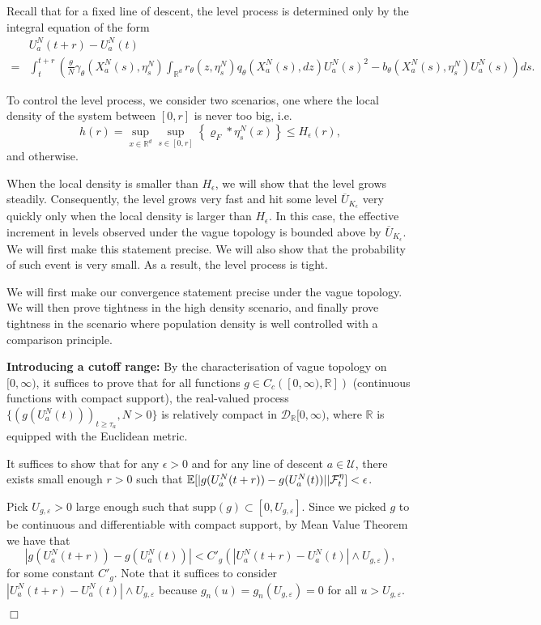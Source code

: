 \documentclass[12pt]{article}
\newenvironment {proof}{{\noindent\bf Proof }}{\hfill $\Box$ \medskip}
\newcommand{\IR}{\mathbb R}
\begin{document}
\begin{proof} Recall that for a fixed line of descent, the level process is determined only by the integral equation of the form 
\begin{align*}
&U^{N}_{a}(t+r)-U^{N}_{a}(t)\\
=&\int_{t}^{t+r}
\left(
        \frac{\theta}{N} \gamma_{\theta}(X^N_{a}(s),\eta^N_s)
        \int_{\IR^d} r_{\theta}(z,\eta^N_s) q_{\theta}(X^N_a(s),dz) U^N_a(s)^2
        -
        b_{\theta}(X^N_a(s),\eta^N_s) U^N_a(s)
    \right)
    ds.
\end{align*}

To control the level process, we consider two scenarios, one where the local density of the system between $[0,r]$ is never too big, i.e.
$$h(r)=\sup_{x \in \IR^d}\sup_{s\in [0,r]}\left\{\varrho_F*\eta^N_s(x) \right\} \leq H_{\epsilon}(r),$$
and otherwise. 

When the local density is smaller than $H_{\epsilon}$, we will show that the level grows steadily. Consequently, the level grows very fast and hit some level $\overline{U}_{K_{\epsilon}}$ very quickly only when the local density is larger than $H_{\epsilon}$. In this case, the effective increment in levels observed under the vague topology is bounded above by $\overline{U}_{K_{\epsilon}}$. We will first make this statement precise. 
We will also show that the probability of such event is very small.
As a result, the level process is tight.

We will first make our convergence statement precise under the vague topology. 
We will then prove tightness in the high density scenario,
and finally
prove tightness in the scenario where population density is well controlled
with a comparison principle.  

\textbf{Introducing a cutoff range:} 
By the characterisation of vague topology on $[0,\infty)$,
it suffices to prove that for all functions $g\in C_{c}([0,\infty), \mathbb{R}])$ (continuous functions with compact support), 
the real-valued process
$\{(g(U^{N}_{a}(t)))_{t \geq \tau_a}, N >0\}$ is relatively compact in 
$\mathcal{D}_{\mathbb{R}}[0,\infty)$,
where $\mathbb{R}$ is equipped with the Euclidean metric.

It suffices to show that for any $\epsilon > 0$ and for any line of descent $a \in \mathcal{U}$, there exists small enough  $r>0$ such that $\mathbb{E}[|g(U^{N}_{a}(t+r))-g(U^{N}_{a}(t))||{\cal F}_t^{
\eta}]< \epsilon$. 

Pick $U_{g,\varepsilon}>0$ large enough such that $\text{supp}(g)\subset [0,U_{g,\varepsilon}]$.
Since we picked $g$ to be continuous and differentiable with compact support, by Mean Value Theorem we have that 
$$|g(U^{N}_{a}(t+r ))-g(U^{N}_{a}(t))|<C'_{g}(|U^{N}_{a}(t+r)-U^{N}_{a}(t)|\wedge U_{g,\varepsilon}),$$
for some constant $C'_g$. Note that it suffices to consider $|U^{N}_{a}(t+r)-U^{N}_{a}(t)|\wedge U_{g,\varepsilon}$ because $g_n(u)=g_n(U_{g,\varepsilon})=0$ for all $u > U_{g,\varepsilon}$.


\end{proof}
\end{document}
